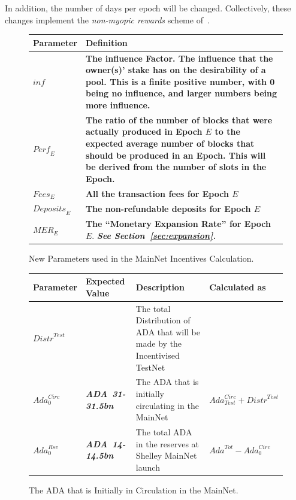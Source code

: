 \documentclass[11pt,a4paper,dvipsnames,twosided,final]{article}
\newcommand{\ada}{ADA{}}
\newcommand{\ADA}[1]{\textbf{\emph{\ada~{#1}}}}
\begin{document}
\noindent
In addition, the number of days per epoch will be changed.  Collectively, these changes implement the \emph{non-myopic rewards} scheme of~\cite{delegation_design,bkks2018}.

\begin{figure}[h!]
\begin{center}
\begin{tabular}{||l|p{13cm}||}
  \hline \hline
  \textbf{Parameter} & \textbf{Definition} \\\hline
\textbf{\color{green}  $\textit{inf}$} & \textbf{\color{green} The influence Factor. The influence that the owner(s)' stake has on the
  desirability of a pool. This is a finite positive number, with 0 being no influence, and larger numbers being more influence. } \\\hline
\textbf{\color{cyan}  $\textit{Perf}_E$} & \textbf{\color{cyan} The ratio of the number of blocks that were actually produced in Epoch $E$ to the expected average number of blocks that should be produced in an Epoch.
  This will be derived from the number of slots in the Epoch.} \\\hline
\textbf{\color{cyan}$\textit{Fees}_E$} & \textbf{\color{cyan}All the transaction fees for Epoch $E$} \\\hline
\textbf{\color{cyan}$\textit{Deposits}_E$} & \textbf{\color{cyan} The non-refundable deposits for Epoch $E$} \\\hline
\textbf{\color{cyan} $\textit{MER}_E$} & \textbf{\color{cyan} The ``Monetary Expansion Rate'' for Epoch $E$}. \newline \textbf{\color{cyan} \emph{See Section~\ref{sec:expansion}.}} \\\hline
\hline
\end{tabular}
\end{center}
\caption{New Parameters used in the MainNet Incentives Calculation.}
\end{figure}

\clearpage
\begin{figure}[h!]
\begin{center}
\begin{tabular}{||l|l|p{6cm}|l||}
  \hline \hline
\textbf{Parameter} & \textbf{Expected Value} & \textbf{Description} & \textbf{Calculated as} \\\hline
${\textit{Distr}}^{Test}$ & & The total Distribution of \ada{} that will be made by the Incentivised TestNet & \\\hline
$\textit{Ada}^{\textit{Circ}}_{0}$ & \ADA{31-31.5bn} & The \ada{} that is initially circulating in the MainNet & $\textit{Ada}^{\textit{Circ}}_{\textit{Test}} + {\textit{Distr}}^{\textit{Test}}$ \\\hline
$\textit{Ada}^{\textit{Rsv}}_{0}$ & \ADA{14-14.5bn} & The total \ada{} in the reserves at Shelley MainNet launch & $\textit{Ada}^{Tot} - \textit{Ada}^{\textit{Circ}}_{0}$ \\\hline
\hline
\end{tabular}
\end{center}
\caption{The \ada{} that is Initially in Circulation in the MainNet.}
\end{figure}
\end{document}

